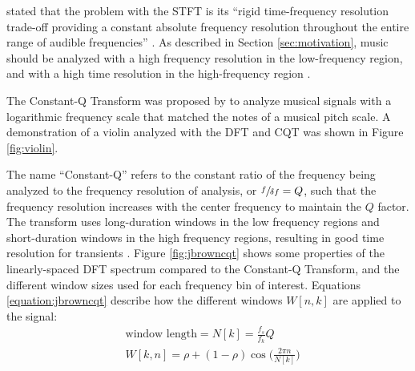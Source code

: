 \documentclass[report.tex]{subfiles}
\begin{document}
\citeauthor{cqtransient} stated that the problem with the STFT is its ``rigid time-frequency resolution trade-off providing a constant absolute frequency resolution throughout the entire range of audible frequencies'' \parencite[1]{cqtransient}. As described in Section \ref{sec:motivation}, music should be analyzed with a high frequency resolution in the low-frequency region, and with a high time resolution in the high-frequency region \parencite{doerflerphd, cqtransient}. 

The Constant-Q Transform was proposed by \textcite{jbrown, msp} to analyze musical signals with a logarithmic frequency scale that matched the notes of a musical pitch scale. A demonstration of a violin analyzed with the DFT and CQT was shown in Figure \ref{fig:violin}.

The name ``Constant-Q'' refers to the constant ratio of the frequency being analyzed to the frequency resolution of analysis, or $\sfrac{f}{\delta f} = Q$, such that the frequency resolution increases with the center frequency to maintain the $Q$ factor. The transform uses long-duration windows in the low frequency regions and short-duration windows in the high frequency regions, resulting in good time resolution for transients \parencite{cqtransient}. Figure \ref{fig:jbrowncqt} shows some properties of the linearly-spaced DFT spectrum compared to the Constant-Q Transform, and the different window sizes used for each frequency bin of interest. Equations \eqref{equation:jbrowncqt} describe how the different windows $W[n, k]$ are applied to the signal:
\begin{align}\tag{9}\label{equation:jbrowncqt}
	\nonumber & \text{window length} = N[k] = \frac{f_{s}}{f_{k}}Q\\
	\nonumber & W[k, n] = \rho + (1 - \rho)\cos\big(\frac{2\pi n}{N[k]}\big)
\end{align}
\end{document}
